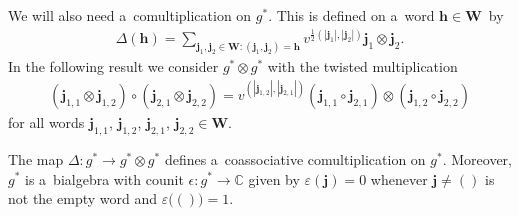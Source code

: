 We will also need a~comultiplication on $g^*$.
This is def\/ined on a~word $\mathbf{h}\in\mathbf{W}$~by
\begin{gather*}
\Delta(\mathbf{h})=\sum\limits_{\mathbf{j}_1,\mathbf{j}_2\in\mathbf{W}:(\mathbf{j}_1,\mathbf{j}_2)=\mathbf{h}}
v^{\frac{1}{2}(|\mathbf{j}_1|,|\mathbf{j}_2|)}\mathbf{j}_1\otimes\mathbf{j}_2.
\end{gather*}
In the following result we consider $g^*\otimes g^*$ with the twisted multiplication
\begin{gather*}
(\mathbf{j}_{1,1}\otimes\mathbf{j}_{1,2})\circ(\mathbf{j}_{2,1}\otimes\mathbf{j}_{2,2})
=v^{(|\mathbf{j}_{1,2}|,|\mathbf{j}_{2,1}|)}(\mathbf{j}_{1,1}\circ\mathbf{j}_{2,1})\otimes(\mathbf{j}_{1,2}\circ\mathbf{j}_{2,2})
\end{gather*}
for all words $\mathbf{j}_{1,1}$, $\mathbf{j}_{1,2}$, $\mathbf{j}_{2,1}$, $\mathbf{j}_{2,2}\in\mathbf{W}$. %
\begin{Lemma}
The map $\Delta:g^*\to g^*\otimes g^*$ defines a~coassociative comultiplication on $g^*$.
Moreover, $g^*$ is a~bialgebra with counit $\epsilon:g^*\to\mathbb{C}$ given by $\varepsilon(\mathbf{j})=0$ whenever
$\mathbf{j}\ne()$ is not the empty word and $\varepsilon\big(()\big)=1$.
\end{Lemma}


